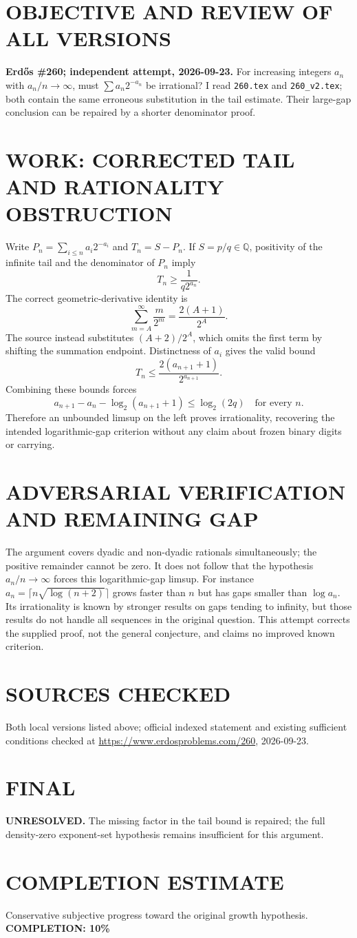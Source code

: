 \section{OBJECTIVE AND REVIEW OF ALL VERSIONS}
\textbf{Erd\H{o}s \#260; independent attempt, 2026-09-23.}
For increasing integers $a_n$ with $a_n/n\to\infty$, must $\sum a_n2^{-a_n}$ be irrational? I read \texttt{260.tex} and \texttt{260\_v2.tex}; both contain the same erroneous substitution in the tail estimate. Their large-gap conclusion can be repaired by a shorter denominator proof.
\section{WORK: CORRECTED TAIL AND RATIONALITY OBSTRUCTION}
Write $P_n=\sum_{i\le n}a_i2^{-a_i}$ and $T_n=S-P_n$. If $S=p/q\in\mathbb Q$, positivity of the infinite tail and the denominator of $P_n$ imply
\[
T_n\ge\frac1{q2^{a_n}}.
\]
The correct geometric-derivative identity is
\[
\sum_{m=A}^\infty\frac m{2^m}=\frac{2(A+1)}{2^A}.
\]
The source instead substitutes $(A+2)/2^A$, which omits the first term by shifting the summation endpoint. Distinctness of $a_i$ gives the valid bound
\[
T_n\le\frac{2(a_{n+1}+1)}{2^{a_{n+1}}}.
\]
Combining these bounds forces
\[
a_{n+1}-a_n-\log_2(a_{n+1}+1)\le\log_2(2q)
\quad\text{for every }n.
\]
Therefore an unbounded limsup on the left proves irrationality, recovering the intended logarithmic-gap criterion without any claim about frozen binary digits or carrying.
\section{ADVERSARIAL VERIFICATION AND REMAINING GAP}
The argument covers dyadic and non-dyadic rationals simultaneously; the positive remainder cannot be zero. It does not follow that the hypothesis $a_n/n\to\infty$ forces this logarithmic-gap limsup. For instance $a_n=\lceil n\sqrt{\log(n+2)}\rceil$ grows faster than $n$ but has gaps smaller than $\log a_n$. Its irrationality is known by stronger results on gaps tending to infinity, but those results do not handle all sequences in the original question. This attempt corrects the supplied proof, not the general conjecture, and claims no improved known criterion.
\section{SOURCES CHECKED}
Both local versions listed above; official indexed statement and existing sufficient conditions checked at \url{https://www.erdosproblems.com/260}, 2026-09-23.
\section{FINAL}
\textbf{UNRESOLVED.} The missing factor in the tail bound is repaired; the full density-zero exponent-set hypothesis remains insufficient for this argument.
\section{COMPLETION ESTIMATE}
Conservative subjective progress toward the original growth hypothesis.
\textbf{COMPLETION: 10\%}
